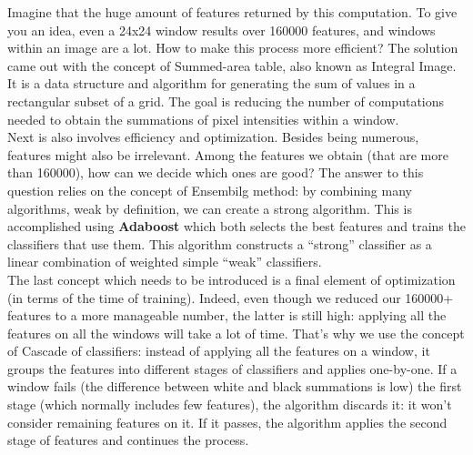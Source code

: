             \vspace{3mm}
            Imagine that the huge amount of features returned by this computation. To give you an idea, even a 24x24 window results over 160000 features, and windows within an image are a lot. How to make this process more efficient? The solution came out with the concept of Summed-area table, 
            also known as Integral Image. It is a data structure and algorithm for generating the sum of values in a rectangular subset of a grid. The goal is reducing the number of computations needed to obtain the summations of pixel intensities within a window. \\
            \vspace{3mm}
            Next is also involves efficiency and optimization. Besides being numerous, features might also be irrelevant. Among the features we obtain (that are more than 160000), how can we decide which ones are good? The answer to this question relies on the concept of Ensembilg method: 
            by combining many algorithms, weak by definition, we can create a strong algorithm. This is accomplished using \textbf{Adaboost} which both selects the best features and trains the classifiers that use them. This algorithm constructs a “strong” classifier as a linear combination of weighted 
            simple “weak” classifiers. \\ 
            \vspace{3mm}
            The last concept which needs to be introduced is a final element of optimization (in terms of the time of training). Indeed, even though we reduced our 160000+ features to a more manageable number, the latter is still high: applying all the features on all the windows will take a lot of time. 
            That’s why we use the concept of Cascade of classifiers: instead of applying all the features on a window, it groups the features into different stages of classifiers and applies one-by-one. If a window fails (the difference between white and black summations is low) the first stage (which normally 
            includes few features), the algorithm discards it: it won’t consider remaining features on it. If it passes, the algorithm applies the second stage of features and continues the process.

